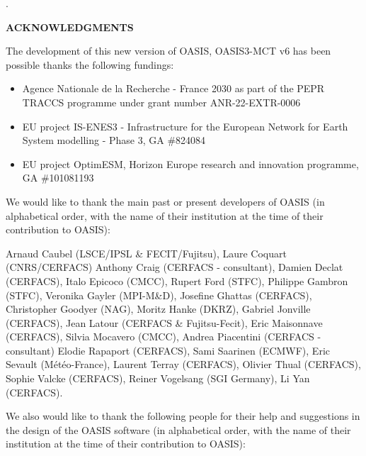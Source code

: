\newpage
.

\vspace{3cm}

{\bf ACKNOWLEDGMENTS}
 
\vspace{1.5cm}
The development of this new version of OASIS, OASIS3-MCT v6 has been
possible thanks the following fundings:
\begin{itemize}
\item  Agence Nationale de la Recherche - France 2030 as part of the PEPR TRACCS programme under grant number ANR-22-EXTR-0006
\item EU project IS-ENES3 - Infrastructure for the European Network for Earth System modelling - Phase 3, GA \#824084
\item EU project OptimESM, Horizon Europe research and innovation programme, GA \#101081193
\end{itemize}
\vspace{0.5cm} 

 We would like to thank the main past or present developers of OASIS (in alphabetical order, with the name of their institution at the time of their contribution to OASIS):

Arnaud Caubel (LSCE/IPSL \& FECIT/Fujitsu),
Laure Coquart (CNRS/CERFACS)
Anthony Craig (CERFACS - consultant),
Damien Declat (CERFACS),
Italo Epicoco (CMCC),
Rupert Ford (STFC),
Philippe Gambron (STFC),
Veronika Gayler (MPI-M\&D),
Josefine Ghattas (CERFACS),
Christopher Goodyer (NAG),
Moritz Hanke (DKRZ),
Gabriel Jonville (CERFACS),
Jean Latour (CERFACS \& Fujitsu-Fecit),
Eric Maisonnave (CERFACS),
Silvia Mocavero (CMCC),
Andrea Piacentini (CERFACS -  consultant)
Elodie Rapaport (CERFACS),
Sami Saarinen (ECMWF),
Eric Sevault (M\'et\'eo-France),
Laurent Terray (CERFACS),
Olivier Thual (CERFACS),
Sophie Valcke (CERFACS),
Reiner Vogelsang (SGI Germany),
Li Yan (CERFACS).

\vspace{0.5cm}
We also would like to thank the following people for their help
and suggestions in the design of the OASIS software (in alphabetical
order, with the name of their institution at the time of their contribution to OASIS):

